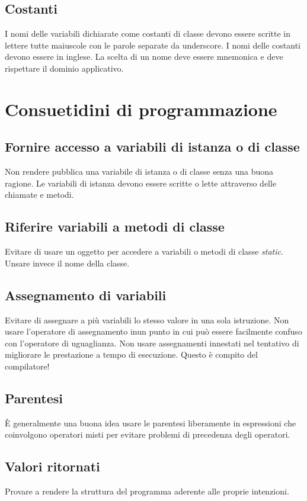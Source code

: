 \subsection{Costanti}
I nomi delle variabili dichiarate come costanti di classe devono essere scritte in lettere tutte maiuscole con le parole separate da underscore. I nomi delle costanti devono essere in inglese. La scelta di un nome deve essere mnemonica e deve rispettare il dominio applicativo.
\clearpage
%
%
\section{Consuetidini di programmazione}
\subsection{Fornire accesso a variabili di istanza o di classe}
Non rendere pubblica una variabile di istanza o di classe senza una buona ragione. Le variabili di istanza devono essere scritte o lette attraverso delle chiamate e metodi.
\subsection{Riferire variabili a metodi di classe}
Evitare di usare un oggetto per accedere a variabili o metodi di classe \textit{static}. Unsare invece il nome della classe.
\subsection{Assegnamento di variabili}
Evitare di assegnare a più variabili lo stesso valore in una sola istruzione. Non usare l'operatore di assegnamento inun punto in cui può essere facilmente confuso con l'operatore di uguaglianza. Non usare assegnamenti innestati nel tentativo di migliorare le prestazione a tempo di esecuzione. Questo è compito del compilatore!
\subsection{Parentesi}
È generalmente una buona idea usare le parentesi liberamente in espressioni che coinvolgono operatori misti per evitare problemi di precedenza degli operatori.
\subsection{Valori ritornati}
Provare a rendere la struttura del programma aderente alle proprie intenzioni.

